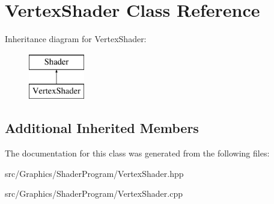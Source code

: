 \hypertarget{class_vertex_shader}{\section{Vertex\+Shader Class Reference}
\label{class_vertex_shader}
}
Inheritance diagram for Vertex\+Shader\+:\begin{figure}[H]
\begin{center}
\leavevmode
\includegraphics[height=2.000000cm]{class_vertex_shader}
\end{center}
\end{figure}
\subsection*{Additional Inherited Members}


The documentation for this class was generated from the following files\+:\begin{DoxyCompactItemize}
\item 
src/\+Graphics/\+Shader\+Program/Vertex\+Shader.\+hpp\item 
src/\+Graphics/\+Shader\+Program/Vertex\+Shader.\+cpp\end{DoxyCompactItemize}
